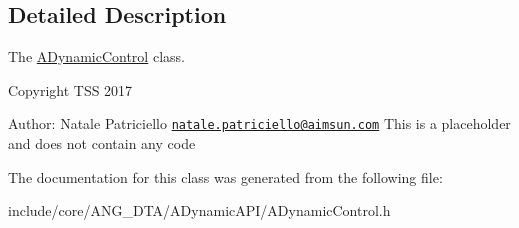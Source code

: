 \subsection{Detailed Description}
The \hyperlink{classADynamicControl}{A\+Dynamic\+Control} class. 

Copyright T\+SS 2017

Author\+: Natale Patriciello \href{mailto:natale.patriciello@aimsun.com}{\tt natale.\+patriciello@aimsun.\+com} This is a placeholder and does not contain any code 

The documentation for this class was generated from the following file\+:\begin{DoxyCompactItemize}
\item 
include/core/\+A\+N\+G\+\_\+\+D\+T\+A/\+A\+Dynamic\+A\+P\+I/A\+Dynamic\+Control.\+h\end{DoxyCompactItemize}
